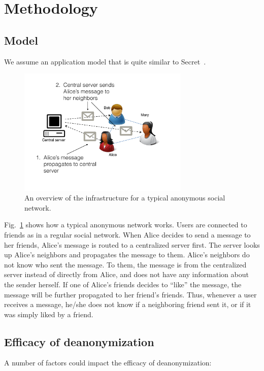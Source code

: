 \section{Methodology}

\subsection{Model}

We assume an application model that is quite similar to Secret~\cite{secret}.

\begin{figure}
\centering
\includegraphics[height = 2.4in]{figures/secret_infrastructure}
\caption{An overview of the infrastructure for a typical anonymous social network.}
\label{fig:secret_infrastructure}
\end{figure}

Fig.~\ref{fig:secret_infrastructure} shows how a typical anonymous network works. Users are connected to friends as in a regular social network. When Alice decides to send a message to her friends, Alice's message is routed to a centralized server first. The server looks up Alice's neighbors and propagates the message to them. Alice's neighbors do not know who sent the message. To them, the message is from the centralized server instead of directly from Alice, and does not have any information about the sender herself. If one of Alice's friends decides to ``like'' the message, the message will be further propagated to her friend's friends. Thus, whenever a user receives a message, he/she does not know if a neighboring friend sent it, or if it was simply liked by a friend.

\subsection{Efficacy of deanonymization}

A number of factors could impact the efficacy of deanonymization:

